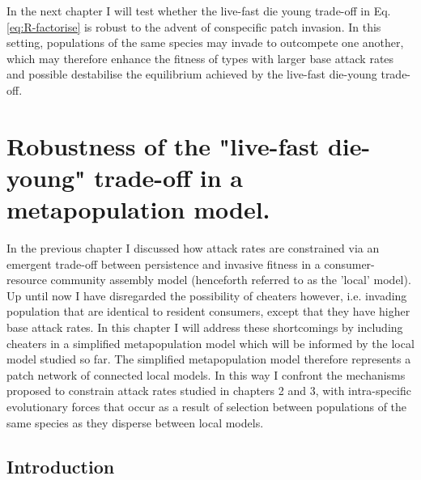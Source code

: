 \documentclass[a4paper]{report}
\begin{document}
{In the next chapter I will test whether the live-fast die young trade-off in Eq. \eqref{eq:R-factorise} is robust to the advent of conspecific patch invasion. In this setting, populations of the same species may invade to outcompete one another, which may therefore enhance the fitness of types with larger base attack rates and possible destabilise the equilibrium achieved by the live-fast die-young trade-off.

\chapter{Robustness of the "live-fast die-young" trade-off in a metapopulation model. \label{ch:chapter_4}}

\maketitle

In the previous chapter I discussed how attack rates are constrained via an emergent trade-off between persistence and invasive fitness in a consumer-resource community assembly model (henceforth referred to as the 'local' model). Up until now I have disregarded the possibility of cheaters however, i.e. invading population that are identical to resident consumers, except that they have higher base attack rates. In this chapter I will address these shortcomings by including cheaters in a simplified metapopulation model which will be informed by the local model studied so far. The simplified metapopulation model therefore represents a patch network of connected local models. In this way I confront the mechanisms proposed to constrain attack rates studied in chapters 2 and 3, with intra-specific evolutionary forces that occur as a result of selection between populations of the same species as they disperse between local models. \\

\section{Introduction}
\label{sec:evol-metap-model}


}
\end{document}
